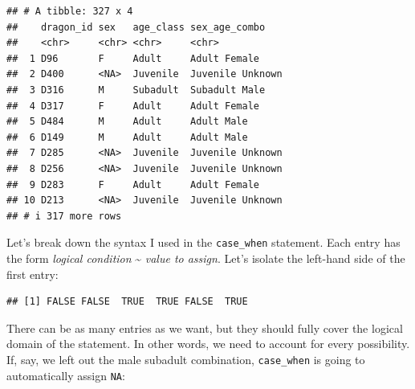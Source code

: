 \documentclass[
]{book}
\newenvironment{Shaded}{\begin{snugshade}}{\end{snugshade}}
\newcommand{\FunctionTok}[1]{\textcolor[rgb]{0.13,0.29,0.53}{\textbf{#1}}}
\newcommand{\NormalTok}[1]{#1}
\newcommand{\SpecialCharTok}[1]{\textcolor[rgb]{0.81,0.36,0.00}{\textbf{#1}}}
\newcommand{\StringTok}[1]{\textcolor[rgb]{0.31,0.60,0.02}{#1}}
\begin{document}
\begin{verbatim}
## # A tibble: 327 x 4
##    dragon_id sex   age_class sex_age_combo   
##    <chr>     <chr> <chr>     <chr>           
##  1 D96       F     Adult     Adult Female    
##  2 D400      <NA>  Juvenile  Juvenile Unknown
##  3 D316      M     Subadult  Subadult Male   
##  4 D317      F     Adult     Adult Female    
##  5 D484      M     Adult     Adult Male      
##  6 D149      M     Adult     Adult Male      
##  7 D285      <NA>  Juvenile  Juvenile Unknown
##  8 D256      <NA>  Juvenile  Juvenile Unknown
##  9 D283      F     Adult     Adult Female    
## 10 D213      <NA>  Juvenile  Juvenile Unknown
## # i 317 more rows
\end{verbatim}

Let's break down the syntax I used in the \texttt{case\_when} statement. Each entry has
the form \emph{logical condition} \textasciitilde{} \emph{value to assign}. Let's isolate the left-hand
side of the first entry:

\begin{Shaded}
\end{Shaded}

\begin{verbatim}
## [1] FALSE FALSE  TRUE  TRUE FALSE  TRUE
\end{verbatim}

There can be as many entries as we want, but they should fully cover the
logical domain of the statement. In other words, we need to account for every
possibility. If, say, we left out the male subadult combination, \texttt{case\_when} is
going to automatically assign \texttt{NA}:
\end{document}
